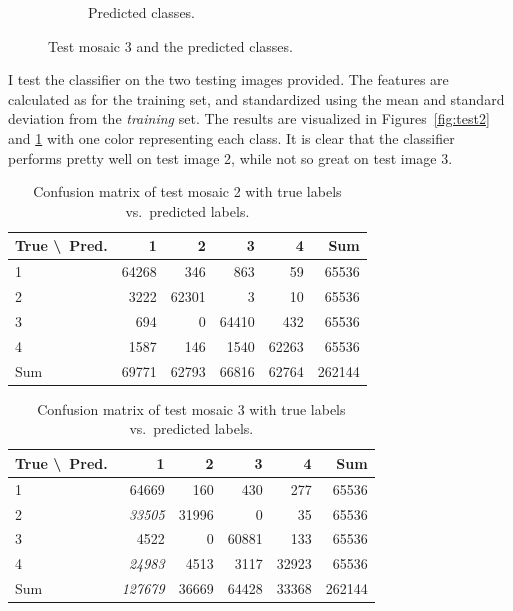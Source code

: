 \documentclass[a4paper]{article}
\begin{document}
\begin{figure}
\begin{subfigure}[b]{0.23\textwidth}
        \caption{%
            Predicted classes.
        }
    \end{subfigure}
    \caption{%
        Test mosaic 3 and the predicted classes.
    }
    \label{fig:test3}
\end{figure}

I test the classifier on the two testing images provided. The features
are calculated as for the training set, and standardized using the mean
and standard deviation from the \emph{training} set. The results
are visualized in Figures~\ref{fig:test2} and \ref{fig:test3} with one
color representing each class. It is clear that the classifier performs
pretty well on test image 2, while not so great on test image 3.

\begin{table}
    \caption{Confusion matrix of test mosaic 2 with true labels vs.\
    predicted labels.}
    \centering
    \begin{tabular}{l | r | r | r | r | r}
        \small{True \textbackslash\ Pred.} & 1 & 2 & 3 & 4 & Sum \\ \hline
        1 & 64268 &    346 &    863 &     59 &   65536 \\ \hline
        2 & 3222  & 62301  &     3  &    10  &  65536  \\ \hline
        3 & 694   &    0   & 64410  &   432  &  65536  \\ \hline
        4 & 1587  &   146  &  1540  & 62263  &  65536  \\ \hline
        Sum & 69771 &  62793 &  66816 &  62764 &  262144
    \end{tabular}
    \label{tab:conf2}
\end{table}

\begin{table}
    \caption{Confusion matrix of test mosaic 3 with true labels vs.\
    predicted labels.}
    \centering
    \begin{tabular}{l | r | r | r | r | r}
        \small{True \textbackslash\ Pred.} & 1 & 2 & 3 & 4 & Sum \\ \hline
        1 &    64669 &   160 &   430 &   277 &  65536 \\ \hline
        2 &    \emph{33505} & 31996 &     0 &    35 &  65536 \\ \hline
        3 &     4522 &     0 & 60881 &   133 &  65536 \\ \hline
        4 &    \emph{24983} &  4513 &  3117 & 32923 &  65536 \\ \hline
        Sum & \emph{127679} & 36669 & 64428 & 33368 & 262144
    \end{tabular}
    \label{tab:conf3}
\end{table}
\end{document}

